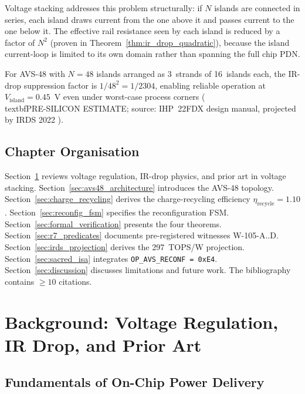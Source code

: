 Voltage stacking addresses this problem structurally: if $N$ islands are
connected in series, each island draws current from the one above it and
passes current to the one below it.  The effective rail resistance seen
by each island is reduced by a factor of $N^2$ (proven in
Theorem~\ref{thm:ir_drop_quadratic}), because the island current-loop
is limited to its own domain rather than spanning the full chip PDN.

For AVS-48 with $N = 48$ islands arranged as 3~strands of 16~islands
each, the IR-drop suppression factor is $1/48^2 = 1/2304$, enabling
reliable operation at $V_\mathrm{island} = 0.45$~V even under worst-case
process corners (\\textbf{PRE-SILICON ESTIMATE};
source: IHP~22FDX design manual, projected by IRDS 2022 \cite{irds2023}).

\subsection{Chapter Organisation}

Section~\ref{sec:background} reviews voltage regulation, IR-drop physics,
and prior art in voltage stacking.
Section~\ref{sec:avs48_architecture} introduces the AVS-48 topology.
Section~\ref{sec:charge_recycling} derives the charge-recycling efficiency
$\eta_\mathrm{recycle} = 1.10$.
Section~\ref{sec:reconfig_fsm} specifies the reconfiguration FSM.
Section~\ref{sec:formal_verification} presents the four theorems.
Section~\ref{sec:r7_predicates} documents pre-registered witnesses W-105-A..D.
Section~\ref{sec:irds_projection} derives the 297~TOPS/W projection.
Section~\ref{sec:sacred_isa} integrates \texttt{OP\_AVS\_RECONF = 0xE4}.
Section~\ref{sec:discussion} discusses limitations and future work.
The bibliography contains $\geq 10$ citations.

\section{Background: Voltage Regulation, IR Drop, and Prior Art}
\label{sec:background}

\subsection{Fundamentals of On-Chip Power Delivery}

